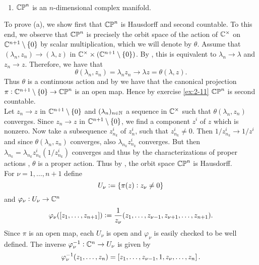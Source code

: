 \begin{exercise}
~
\begin{enumerate}[label = \textup{(}\alph*\textup{)}]
\item $\mathbb{CP}^n$ is an $n$-dimensional complex manifold.
\end{enumerate}
\end{exercise}

\begin{solution}
To prove (a), we show first that $\mathbb{CP}^n$ is Hausdorff and second countable. To this end, we observe that $\mathbb{CP}^n$ is precisely the orbit space of the action of $\mathbb{C}^\times$ on $\Cbb^{n + 1}\setminus \cbr[0]{0}$ by scalar multiplication, which we will denote by $\theta$. Assume that $(\lambda_n,z_n) \to (\lambda,z)$ in $\Cbb^\times \times (\Cbb^{n + 1}\setminus \cbr[0]{0})$. By \cite[260]{engelking:general_topology:1989}, this is equivalent to $\lambda_n \to \lambda$ and $z_n \to z$. Therefore, we have that 
\begin{equation*}
\theta(\lambda_n,z_n) = \lambda_nz_n \to \lambda z = \theta(\lambda,z).
\end{equation*}
Thus $\theta$ is a continuous action and by \cite[541]{lee:smooth_manifolds:2013} we have that the canonical projection $\pi : \Cbb^{n + 1}\setminus \cbr[0]{0} \to \CPbb^n$ is an open map. Hence by exercise \ref{ex:2-11} $\mathbb{CP}^n$ is second countable.\\
Let $z_n \to z$ in $\Cbb^{n + 1}\setminus \cbr[0]{0}$ and $(\lambda_n)_{n \in \mathbb{N}}$ a sequence in $\mathbb{C}^\times$ such that $\theta(\lambda_n,z_n)$ converges. Since $z_n \to z$ in $\Cbb^{n + 1}\setminus \cbr[0]{0}$, we find a component $z^i$ of $z$ which is nonzero. Now take a subsequence $z^i_{n_k}$ of $z^i_n$, such that $z^i_{n_k} \neq 0$. Then $1/z^i_{n_k} \to 1/z^i$ and since $\theta(\lambda_n,z_n)$ converges, also $\lambda_{n_k}z^i_{n_k}$ converges. But then $\lambda_{n_k} = \lambda_{n_k}z^i_{n_k}(1/z^i_{n_k})$ converges and thus by the characterizations of proper actions \cite[543]{lee:smooth_manifolds:2013}, $\theta$ is a proper action. Thus by \cite[543]{lee:smooth_manifolds:2013}, the orbit space $\mathbb{CP}^n$ is Hausdorff.\\
For $\nu = 1,\dots,n+1$ define
\begin{equation*}
U_\nu := \cbr[0]{\pi(z) : z_\nu \neq 0}
\end{equation*}
\noindent and $\varphi_\nu : U_\nu \to \mathbb{C}^n$
\begin{equation*}
\varphi_\nu(\eqclass{z_1,\dots,z_{n + 1}}) := \frac{1}{z_\nu}(z_1,\dots,z_{\nu - 1},z_{\nu + 1},\dots,z_{n + 1}).
\end{equation*}
Since $\pi$ is an open map, each $U_\nu$ is open and $\varphi_\nu$ is easily checked to be well defined. The inverse $\varphi_\nu^{-1} : \mathbb{C}^n \to U_\nu$ is given by
\begin{equation*}
\varphi_\nu^{-1}(z_1,\dots,z_n) = \eqclass{z_1,\dots,z_{\nu - 1},1,z_\nu,\dots,z_n}.
\end{equation*}

\end{solution}